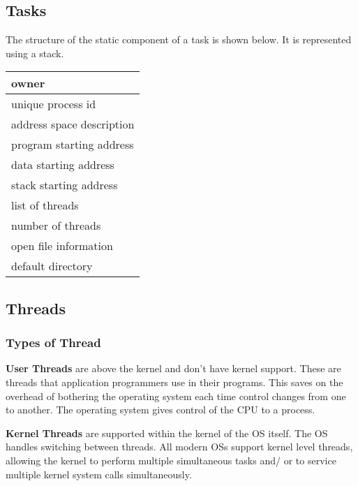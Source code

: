 \subsection{Tasks}
The structure of the static component of a task is shown below. It is represented using a stack.
\begin{table}[H]
    \centering
    \begin{tabular}{|p{}|}
        \hline
        owner\\
        \hline
        unique process id\\
        \hline
        address space description\\
        \hline
        program starting address\\
        \hline
        data starting address\\
        \hline
        stack starting address\\
        \hline
        list of threads\\
        \hline
        number of threads\\
        \hline
        open file information\\
        \hline
        default directory\\ 
        \hline
    \end{tabular}
\end{table}

\subsection{Threads}

\subsubsection{Types of Thread}
\textbf{User Threads} are above the kernel and don't have kernel support. These are threads that application programmers use in their programs. This saves on the overhead of bothering the operating system each time control changes from one to another. The operating system gives control of the CPU to a process.

\textbf{Kernel Threads} are supported within the kernel of the OS itself. The OS handles switching between threads. All modern OSs support kernel level threads, allowing the kernel to perform multiple simultaneous tasks and/ or to service multiple kernel system calls simultaneously. 

